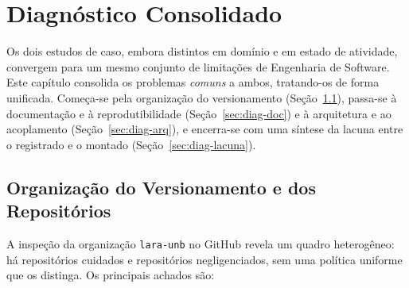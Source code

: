 \chapter{Diagnóstico Consolidado}
\label{cap:diagnostico}

Os dois estudos de caso, embora distintos em domínio e em estado de atividade, convergem
para um mesmo conjunto de limitações de Engenharia de Software. Este capítulo consolida os
problemas \emph{comuns} a ambos, tratando-os de forma unificada. Começa-se pela organização
do versionamento (Seção~\ref{sec:diag-git}), passa-se à documentação e à reprodutibilidade
(Seção~\ref{sec:diag-doc}) e à arquitetura e ao acoplamento (Seção~\ref{sec:diag-arq}), e
encerra-se com uma síntese da lacuna entre o registrado e o montado
(Seção~\ref{sec:diag-lacuna}).

\section{Organização do Versionamento e dos Repositórios}
\label{sec:diag-git}

A inspeção da organização \texttt{lara-unb} no GitHub revela um quadro heterogêneo: há
repositórios cuidados e repositórios negligenciados, sem uma política uniforme que os
distinga. Os principais achados são:

